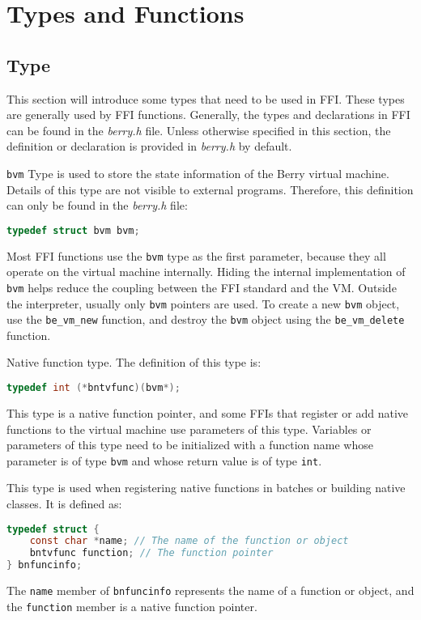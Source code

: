 \section {Types and Functions}

\subsection {Type}

This section will introduce some types that need to be used in FFI. These types are generally used by FFI functions. Generally, the types and declarations in FFI can be found in the \textsl{berry.h} file. Unless otherwise specified in this section, the definition or declaration is provided in \textsl{berry.h} by default.


\texttt{bvm} Type is used to store the state information of the Berry virtual machine. Details of this type are not visible to external programs. Therefore, this definition can only be found in the \textsl{berry.h} file:
\begin{lstlisting}[language=c, numbers=none]
typedef struct bvm bvm;
\end{lstlisting}

Most FFI functions use the \texttt{bvm} type as the first parameter, because they all operate on the virtual machine internally. Hiding the internal implementation of \texttt{bvm} helps reduce the coupling between the FFI standard and the VM. Outside the interpreter, usually only \texttt{bvm} pointers are used. To create a new \texttt{bvm} object, use the \texttt{be\_vm\_new} function, and destroy the \texttt{bvm} object using the \texttt{be\_vm\_delete} function.

Native function type. The definition of this type is:
\begin{lstlisting}[language=c, style=berry, numbers=none]
typedef int (*bntvfunc)(bvm*);
\end{lstlisting}
This type is a native function pointer, and some FFIs that register or add native functions to the virtual machine use parameters of this type. Variables or parameters of this type need to be initialized with a function name whose parameter is of type \texttt{bvm} and whose return value is of type \texttt{int}.


This type is used when registering native functions in batches or building native classes. It is defined as:
\begin{lstlisting}[language=c, style=berry, numbers=none]
typedef struct {
    const char *name; // The name of the function or object
    bntvfunc function; // The function pointer
} bnfuncinfo;
\end{lstlisting}
The \texttt{name} member of \texttt{bnfuncinfo} represents the name of a function or object, and the \texttt{function} member is a native function pointer.

